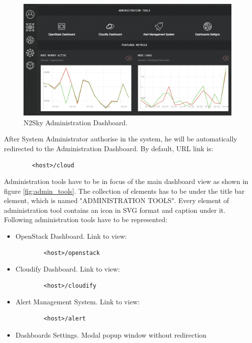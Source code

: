 \begin{figure}[htbp]
\begin{center}
  \includegraphics[width=\linewidth]{components/4/pics/admin_dashboard.png}
  \caption{N2Sky Administration Dashboard.}
  \label{fig:admin_dashboard}
\end{center}
\end{figure}

After System Administrator authorise in the system, he will be automatically redirected to the Administration Dashboard. By default, URL link is:
\begin{lstlisting}
        <host>/cloud
\end{lstlisting}

Administration tools have to be in focus of the main dashboard view as shown in figure \ref{fig:admin_tools}. The collection of elements has to be under the title bar element, which is named "ADMINISTRATION TOOLS". Every element of administration tool contains an icon in SVG \cite{Cagle2005} format and caption under it. Following administration tools have to be represented: 
\begin{itemize}
\item OpenStack Dashboard. Link to view: 
\begin{lstlisting}
        <host>/openstack
\end{lstlisting}
\item Cloudify Dashboard. Link to view: 
\begin{lstlisting}
        <host>/cloudify
\end{lstlisting}
\item Alert Management System. Link to view: 
\begin{lstlisting}
        <host>/alert
\end{lstlisting}
\item Dashboards Settings. Modal popup window without redirection
\end{itemize}

